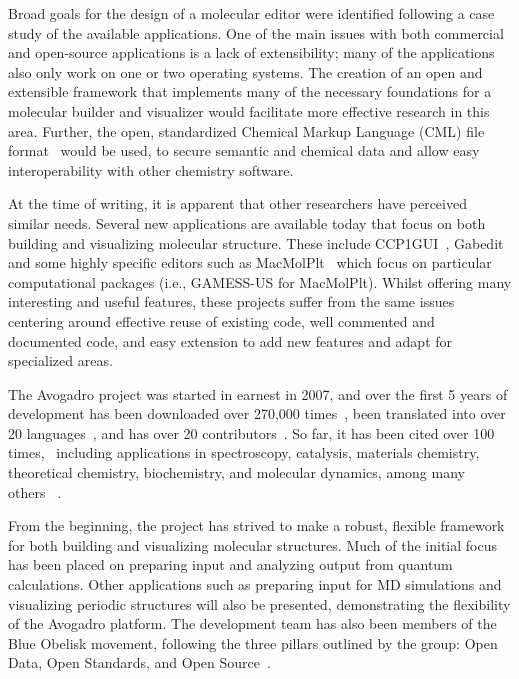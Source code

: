 \documentclass[10pt]{bmc_article}
\newenvironment{bmcformat}{\begin{raggedright}
\baselineskip20pt\sloppy\setboolean{publ}{false}}{\end{raggedright}
\baselineskip20pt\sloppy}
\begin{document}
\begin{bmcformat}
Broad goals for the design of a molecular editor were identified following a
case study of the available applications. One of the main issues with both
commercial and open-source applications is a lack of extensibility; many of the
applications also only work on one or two operating systems. The
creation of an open and extensible framework that implements many of the necessary foundations
for a molecular builder and visualizer would facilitate more effective research
in this area. Further, the open, standardized Chemical Markup Language
(CML) file format~\cite{CML2011a, CML2011b} would be used, to secure
semantic and chemical data and allow easy interoperability with other
chemistry software.

At the time of writing, it is apparent that other researchers have perceived
similar needs. Several new applications are available today that focus on both
building and visualizing molecular structure. These include
CCP1GUI~\cite{CCP1GUI}, Gabedit~\cite{Gabedit} and some highly specific
editors such as MacMolPlt~\cite{MacMolPlt} which focus on particular
computational packages (i.e., GAMESS-US for MacMolPlt). Whilst offering many
interesting and
useful features, these projects suffer from the same issues centering
around effective reuse of existing code, well commented and documented code, and
easy extension to add new features and adapt for specialized areas.

The Avogadro project was started in earnest in 2007, and over the
first 5 years of development has been downloaded over 270,000
times~\cite{Downloads}, been translated into over 20
languages~\cite{Translations}, and has over 20
contributors~\cite{OhlohContributors}. So far, it has been cited over
100 times,~\cite{ScholarCitations} including applications in spectroscopy, catalysis,
materials chemistry, theoretical chemistry, biochemistry, and
molecular dynamics, among many
others~\cite{MeraAdasme:2011hj,Closser:2010kc,Ide:2011cj}
\cite{Menegazzo:2012by,Patel:2011fe,Popov:2011gv,Hu:2011ce,Bingol:2012kx}
\cite{Yao:2010id,Fleisher:2011vz,Mayorkas:2011eu,Tian:2011ej,Kapla:2012ho}
\cite{Mandal:2012ff,Bernstein:2010kc,Hlawacek:2011gh,Forster:2012ka}
\cite{Burkhardt:2010kc,Burkhardt:2011hn,Madison:2011kw}.

From the beginning, the project
has strived to make a robust, flexible framework for
both building and visualizing molecular structures. Much of the initial focus
has been placed on preparing input and analyzing output from quantum
calculations. Other applications such as preparing input for MD simulations and
visualizing periodic structures will also be presented, demonstrating the
flexibility of the Avogadro platform. The development team has also been
members of the Blue Obelisk movement, following the three pillars outlined by
the group: Open Data, Open Standards, and Open Source~\cite{BlueObelisk2006,
BlueObelisk2011}.


\end{bmcformat}
\end{document}
